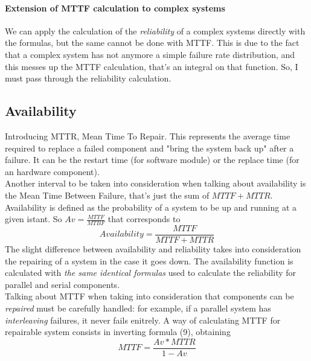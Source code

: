 \documentclass[10pt,a4paper]{article}
\begin{document}
				\paragraph{Extension of MTTF calculation to complex systems}
					We can apply the calculation of the \emph{reliability} of a complex systems directly with the formulas, but the same cannot be done with MTTF. This is due to the fact that a complex system has not anymore a simple failure rate distribution, and this messes up the MTTF calculation, that's an integral on that function. So, I must pass through the reliability calculation.

			\subsection{Availability}
				Introducing MTTR, Mean Time To Repair. This represents the average time required to replace a failed component and "bring the system back up" after a failure. It can be the restart time (for software module) or the replace time (for an hardware component).\\
				Another interval to be taken into consideration when talking about availability is the Mean Time Between Failure, that's just the sum of $MTTF + MTTR$. Availability is defined as the probability of a system to be up and running at a given istant. So $Av = \frac{MTTF}{MTBF}$ that corresponds to
				\begin{equation}
					Availability = \frac{MTTF}{MTTF+MTTR}
				\end{equation}
				The slight difference between availability and reliability takes into consideration the repairing of a system in the case it goes down. The availability function is calculated with \emph{the same identical formulas} used to calculate the reliability for parallel and serial components.\\
				Talking about MTTF when taking into consideration that components can be \emph{repaired} must be carefully handled: for example, if a parallel system has \emph{interleaving} failures, it never fails enitrely. A way of calculating MTTF for repairable system consists in inverting formula (9), obtaining
				\begin{equation}
					MTTF = \frac{Av*MTTR}{1-Av}
				\end{equation}
\end{document}
